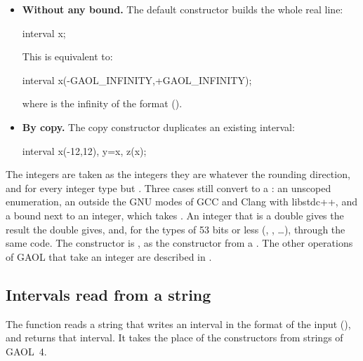 \begin{itemize}
\item[$\bullet$] \textbf{Without any bound.} The default constructor builds
  the whole real line:
  \begin{example}
    interval x;
  \end{example}
  This is equivalent to:
  \begin{example}
    interval x(-GAOL_INFINITY,+GAOL_INFINITY);
  \end{example}
  \noindent where  is the infinity of the 
  format ().

\item[$\bullet$] \textbf{By copy.} The copy constructor duplicates an
  existing interval:
  \begin{example}
    interval x(-12,12), y=x, z(x);
  \end{example}
\end{itemize}

\begin{Rem}
%
The integers are taken as the integers they are whatever the rounding
direction, and for every integer type but .\newinvfive{} Three
cases still convert to a : an unscoped enumeration, an
 outside the GNU modes of GCC and Clang with libstdc++, and a  bound next to an integer, which takes .
An integer that is a double gives the result the double gives, and, for the
types of 53 bits or less (, , \ldots),
through the same code. The constructor  is
, as the constructor from a . The other
operations of GAOL that take an integer are described in
.
\end{Rem}

\subsection{Intervals read from a string}

The function  reads a string that writes an interval
in the format of the input (), and returns that
interval. It takes the place of the constructors from strings of GAOL~4.

